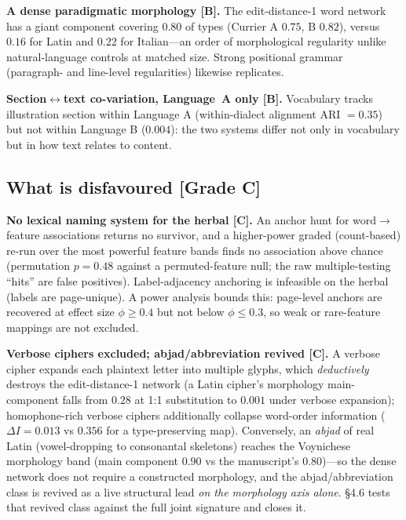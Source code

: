 \documentclass[11pt]{article}
\newcommand{\grade}[1]{{\small\textbf{[#1]}}}
\begin{document}
\textbf{A dense paradigmatic morphology \grade{B}.} The edit-distance-1 word network
has a giant component covering $0.80$ of types (Currier A $0.75$, B $0.82$), versus
$0.16$ for Latin and $0.22$ for Italian---an order of morphological regularity unlike
natural-language controls at matched size. Strong positional grammar (paragraph- and
line-level regularities) likewise replicates.

\textbf{Section$\leftrightarrow$text co-variation, Language~A only \grade{B}.}
Vocabulary tracks illustration section within Language A (within-dialect alignment ARI
$=0.35$) but not within Language B ($0.004$): the two systems differ not only in
vocabulary but in how text relates to content.

\subsection{What is disfavoured \grade{Grade C}}
\textbf{No lexical naming system for the herbal \grade{C}.} An anchor hunt for
word$\rightarrow$feature associations returns no survivor, and a higher-power graded
(count-based) re-run over the most powerful feature bands finds no association above
chance (permutation $p=0.48$ against a permuted-feature null; the raw multiple-testing
``hits'' are false positives). Label-adjacency anchoring is infeasible on the herbal
(labels are page-unique). A power analysis bounds this: page-level anchors are
recovered at effect size $\phi\geq 0.4$ but not below $\phi\leq 0.3$, so weak or
rare-feature mappings are not excluded.

\textbf{Verbose ciphers excluded; abjad/abbreviation revived \grade{C}.} A verbose
cipher expands each plaintext letter into multiple glyphs, which \emph{deductively}
destroys the edit-distance-1 network (a Latin cipher's morphology main-component falls
from $0.28$ at 1:1 substitution to $0.001$ under verbose expansion); homophone-rich
verbose ciphers additionally collapse word-order information ($\Delta I = 0.013$ vs
$0.356$ for a type-preserving map). Conversely, an \emph{abjad} of real Latin
(vowel-dropping to consonantal skeletons) reaches the Voynichese morphology band
(main component $0.90$ vs the manuscript's $0.80$)---so the dense network does not
require a constructed morphology, and the abjad/abbreviation class
\citep{hauer2016decoding} is revived as a live structural lead \emph{on the morphology
axis alone}. \S4.6 tests that revived class against the full joint signature and
closes it.
\end{document}

